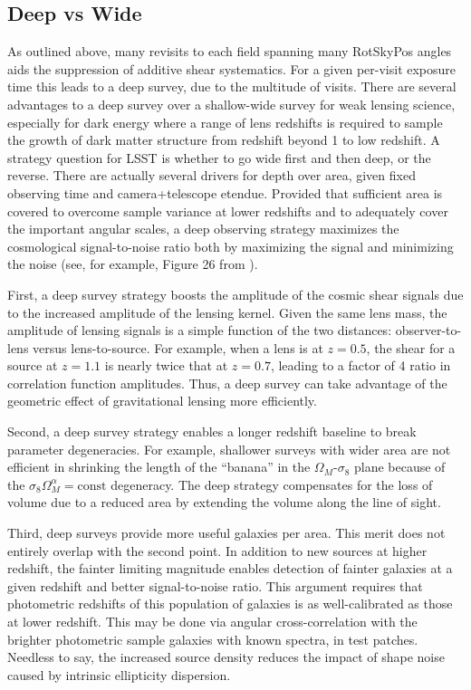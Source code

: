 \subsection{Deep vs Wide}

As outlined above, many revisits to each field spanning many RotSkyPos angles
aids the suppression of additive shear systematics.  For a given per-visit
exposure time this leads to a deep survey, due to the multitude of visits.
There are several advantages to a deep survey over a shallow-wide survey for
weak lensing science, especially for dark energy where a range of lens redshifts
is required to sample the growth of dark matter structure from redshift beyond 1
to low redshift.  A strategy question for LSST is whether to go wide first and
then deep, or the reverse.  There are actually several drivers for depth over
area, given fixed observing time and camera+telescope etendue.  Provided that
sufficient area is covered to overcome sample variance at lower redshifts and to
adequately cover the important angular scales, a deep observing strategy
maximizes the cosmological signal-to-noise ratio both by maximizing the signal
and minimizing the noise (see, for example, Figure 26 from \citep{Jee2013}).

First, a deep survey strategy boosts the amplitude of the cosmic shear signals
due to the increased amplitude of the lensing kernel.  Given the same lens mass,
the amplitude of lensing signals is a simple function of the two distances:
observer-to-lens versus lens-to-source.  For example, when a lens is at $z =
0.5$, the shear for a source at $z = 1.1$ is nearly twice that at $z = 0.7$,
leading to a factor of 4 ratio in correlation function amplitudes.  Thus, a deep
survey can take advantage of the geometric effect of gravitational lensing more
efficiently.

Second, a deep survey strategy enables a longer redshift baseline to break
parameter degeneracies.  For example, shallower surveys with wider area are not
efficient in shrinking the length of the ``banana'' in the $\Omega_M$-$\sigma_8$
plane because of the $\sigma_8 \Omega_M^\alpha = \mathrm{const}$ degeneracy.
The deep strategy compensates for the loss of volume due to a reduced area by
extending the volume along the line of sight.

Third, deep surveys provide more useful galaxies per area.  This merit does not
entirely overlap with the second point.  In addition to new sources at higher
redshift, the fainter limiting magnitude enables detection of fainter galaxies
at a given redshift and better signal-to-noise ratio.  This argument requires
that photometric redshifts of this population of galaxies is as well-calibrated
as those at lower redshift.  This may be done via angular cross-correlation with
the brighter photometric sample galaxies with known spectra, in test patches.
Needless to say, the increased source density reduces the impact of shape noise
caused by intrinsic ellipticity dispersion.

